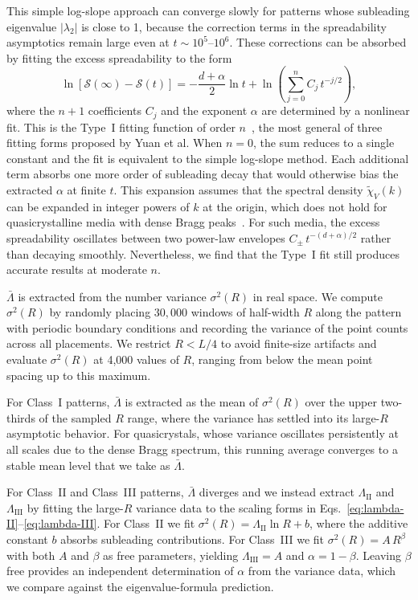\documentclass[11pt]{article}
\begin{document}
This simple log-slope approach can converge slowly for patterns whose subleading eigenvalue $|\lambda_2|$ is close to 1, because the correction terms in the spreadability asymptotics remain large even at $t \sim 10^5$--$10^6$. These corrections can be absorbed by fitting the excess spreadability to the form~\cite{yuan2026spreadability}
\begin{equation}
\ln[\mathcal{S}(\infty) - \mathcal{S}(t)] = -\frac{d+\alpha}{2}\ln t + \ln\!\left(\sum_{j=0}^{n} C_j\, t^{-j/2}\right),
\label{eq:yuan-typeI}
\end{equation}
where the $n+1$ coefficients $C_j$ and the exponent $\alpha$ are determined by a nonlinear fit. This is the Type~I fitting function of order $n$~\cite{yuan2026spreadability}, the most general of three fitting forms proposed by Yuan et al. When $n = 0$, the sum reduces to a single constant and the fit is equivalent to the simple log-slope method. Each additional term absorbs one more order of subleading decay that would otherwise bias the extracted $\alpha$ at finite $t$. This expansion assumes that the spectral density $\tilde\chi_V(k)$ can be expanded in integer powers of $k$ at the origin, which does not hold for quasicrystalline media with dense Bragg peaks~\cite{yuan2026spreadability}. For such media, the excess spreadability oscillates between two power-law envelopes $C_\pm\, t^{-(d+\alpha)/2}$ rather than decaying smoothly. Nevertheless, we find that the Type~I fit still produces accurate results at moderate $n$.

$\bar\Lambda$ is extracted from the number variance $\sigma^2(R)$ in real space. We compute $\sigma^2(R)$ by randomly placing $30{,}000$ windows of half-width $R$ along the pattern with periodic boundary conditions and recording the variance of the point counts across all placements. We restrict $R < L/4$ to avoid finite-size artifacts and evaluate $\sigma^2(R)$ at 4{,}000 values of $R$, ranging from below the mean point spacing up to this maximum.

For Class~I patterns, $\bar\Lambda$ is extracted as the mean of $\sigma^2(R)$ over the upper two-thirds of the sampled $R$ range, where the variance has settled into its large-$R$ asymptotic behavior. For quasicrystals, whose variance oscillates persistently at all scales due to the dense Bragg spectrum, this running average converges to a stable mean level that we take as $\bar\Lambda$.

For Class~II and Class~III patterns, $\bar\Lambda$ diverges and we instead extract $\Lambda_\text{II}$ and $\Lambda_\text{III}$ by fitting the large-$R$ variance data to the scaling forms in Eqs.~\eqref{eq:lambda-II}--\eqref{eq:lambda-III}. For Class~II we fit $\sigma^2(R) = \Lambda_\text{II}\ln R + b$, where the additive constant $b$ absorbs subleading contributions. For Class~III we fit $\sigma^2(R) = A\,R^{\beta}$ with both $A$ and $\beta$ as free parameters, yielding $\Lambda_\text{III} = A$ and $\alpha = 1 - \beta$. Leaving $\beta$ free provides an independent determination of $\alpha$ from the variance data, which we compare against the eigenvalue-formula prediction.
\end{document}
